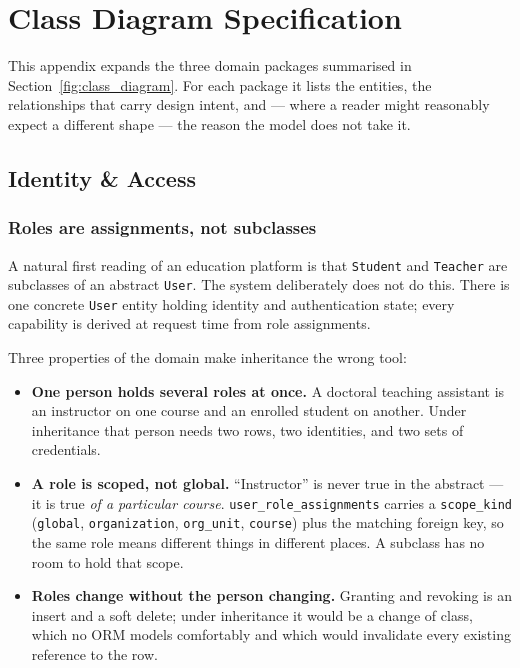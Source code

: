\section{Class Diagram Specification}
\label{appendix:class-diagram}

This appendix expands the three domain packages summarised in Section~\ref{fig:class_diagram}. For each package it lists the entities, the relationships that carry design intent, and --- where a reader might reasonably expect a different shape --- the reason the model does not take it.

\subsection{Identity \& Access}

\subsubsection{Roles are assignments, not subclasses}

A natural first reading of an education platform is that \texttt{Student} and \texttt{Teacher} are subclasses of an abstract \texttt{User}. The system deliberately does not do this. There is one concrete \texttt{User} entity holding identity and authentication state; every capability is derived at request time from role assignments.

Three properties of the domain make inheritance the wrong tool:

\begin{itemize}
    \item \textbf{One person holds several roles at once.} A doctoral teaching assistant is an instructor on one course and an enrolled student on another. Under inheritance that person needs two rows, two identities, and two sets of credentials.
    \item \textbf{A role is scoped, not global.} ``Instructor'' is never true in the abstract --- it is true \emph{of a particular course}. \texttt{user\_role\_assignments} carries a \texttt{scope\_kind} (\texttt{global}, \texttt{organization}, \texttt{org\_unit}, \texttt{course}) plus the matching foreign key, so the same role means different things in different places. A subclass has no room to hold that scope.
    \item \textbf{Roles change without the person changing.} Granting and revoking is an insert and a soft delete; under inheritance it would be a change of class, which no ORM models comfortably and which would invalidate every existing reference to the row.
\end{itemize}

